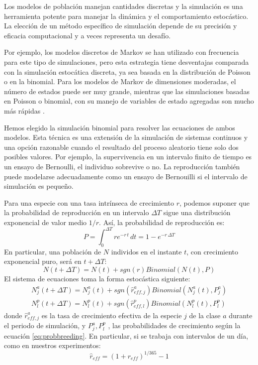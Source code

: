 Los modelos de población manejan cantidades discretas y la simulación es una herramienta potente para manejar la dinámica y el comportamiento estocástico. La elección de un método específico de simulación depende de su precisión y eficacia computacional y a veces representa un desafío.

Por ejemplo, los modelos discretos de Markov se han utilizado con frecuencia para este tipo de simulaciones, pero esta estrategia tiene desventajas comparada con la simulación estocática discreta, ya sea basada en la distribución de Poisson o en la binomial. Para los modelos de Markov de dimensiones moderadas, el número de estados puede ser muy grande, mientras que las simulaciones basadas en Poisson o binomial, con su manejo de variables de estado agregadas son mucho más rápidas  \cite{gustafsson2007bringing, balcan2009multiscale}.

Hemos elegido la simulación binomial para resolver las ecuaciones de ambos modelos. Esta técnica es una extensión de la simulación de sistemas continuos y una opción razonable cuando el resultado del proceso aleatorio tiene solo dos posibles valores. Por ejemplo, la supervivencia en un intervalo finito de tiempo es un ensayo de Bernoulli, el individuo sobrevive o no. La reproducción también puede modelarse adecuadamente como un ensayo de Bernouilli si el intervalo de simulación es pequeño. 

Para una especie con una tasa intrínseca de crecimiento $r$, podemos suponer que la probabilidad de reproducción en un intervalo $\Delta T$ sigue una distribución exponencial de valor medio $1/r$. Así, la probabilidad de reproducción es:
\begin{equation}
\label{eq:probbreeding}
P = \int_0^{\Delta T} \! re^{-r\, t}  \, dt = 1 - e^{-r\, \Delta T}
\end{equation}
En particular, una población de $N$ individos en el instante $t$, con crecimiento exponencial puro, será en $t+\Delta T$:
\begin{equation}
N(t+\Delta T)=N(t) + sgn \left(r \right) Binomial \left( N(t),P \right)
\end{equation}
\noindent El sistema de ecuaciones toma la forma estocástica siguiente:
\begin{equation}
\begin{split}
N^{a}_{j}(t+\Delta T)=N^{a}_{j}(t) + sgn \left(\hat{r}^{a}_{eff,j} \right) Binomial \left( N^{a}_{j}(t),P^{a}_{j}\right)\\
N^{p}_{l}(t+\Delta T)=N^{p}_{l}(t) + sgn \left(\hat{r}^{p}_{eff,l} \right) Binomial \left(N^{p}_{l}(t),P^{p}_{l} \right)
\end{split}
\end{equation}
\noindent donde $\hat{r}^{a}_{eff,j}$ es la tasa de crecimiento efectiva de la especie $j$ de la clase $a$ durante el periodo de simulación, y $P^{a}_{j}, P^{p}_{l}$ , las probabilidades de crecimiento según la ecuación \ref{eq:probbreeding}. En particular, si se trabaja con intervalos de un día, como en nuestros experimentos:
\begin{equation}
\hat{r}_{eff} = (1+r_{eff})^{1/365}-1
\end{equation}

